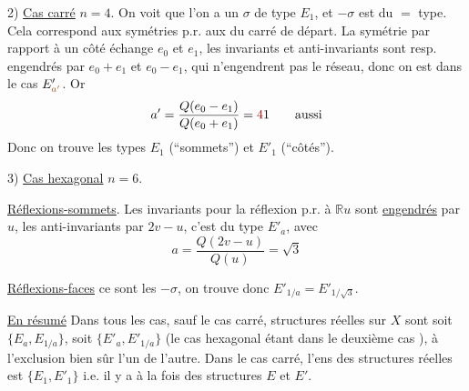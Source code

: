 2) \uline{Cas carré} $n=4$. On voit que l'on a un $\sigma$ de type $E_1$,
et $-\sigma$ est du $=$ type. Cela correspond aux
symétries p.r. aux  du carré de
départ. La symétrie par rapport à un côté
échange $e_0$ et $e_1$, les invariants et anti-invariants
sont resp. engendrés par $e_0+e_1$ et $e_0-e_1$, qui n'engendrent
pas le réseau, donc on est dans le cas $E'_{\unsure{a'}}$. Or
\[
a'=\frac{Q(e_0-e_1)}{Q(e_0+e_1)}=\deleted{4}1\qquad\text{aussi}
\]
Donc on trouve les types $E_1$ (``sommets'') et $E'_1$ (``côtés'').

3) \uline{Cas hexagonal} $n=6$.

\uline{Réflexions-sommets}. Les  invariants pour
la réflexion p.r. à $\mathbb R u$ sont \uline{engendrés}
par $u$, les anti-invariants par $2v-u$, c'est
du type $E'_a$, avec
\[
a=\frac{Q(2v-u)}{Q(u)}=\sqrt3
\]

\uline{Réflexions-faces} ce sont les $-\sigma$, on trouve donc $E'_{1/a}=E'_{1/\sqrt3}$.

\uline{En résumé} Dans tous les cas, sauf le cas carré, 
 structures réelles sur $X$ sont soit 
$\{E_a,E_{1/a}\}$,
 soit $\{E'_a,E'_{1/a}\}$ 
(le cas hexagonal étant dans le
deuxième cas ), à l'exclusion bien sûr l'un de l'autre.
Dans le cas carré, l'ens des structures réelles
est $\{E_1,E'_1\}$ i.e. il y a à la fois des structures $E$ et $E'$.

